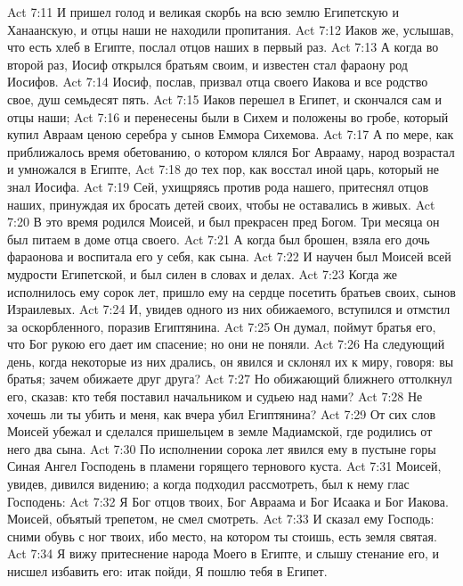 \vs Act 7:11 И пришел голод и великая скорбь на всю землю Египетскую и Ханаанскую, и отцы наши не находили пропитания.
\vs Act 7:12 Иаков же, услышав, что есть хлеб в Египте, послал  отцов наших в первый раз.
\vs Act 7:13 А когда  во второй раз, Иосиф открылся братьям своим, и известен стал фараону род Иосифов.
\vs Act 7:14 Иосиф, послав, призвал отца своего Иакова и все родство свое, душ семьдесят пять.
\vs Act 7:15 Иаков перешел в Египет, и скончался сам и отцы наши;
\vs Act 7:16 и перенесены были в Сихем и положены во гробе, который купил Авраам ценою серебра у сынов Еммора Сихемова.
\vs Act 7:17 А по мере, как приближалось время  обетованию, о котором клялся Бог Аврааму, народ возрастал и умножался в Египте,
\vs Act 7:18 до тех пор, как восстал иной царь, который не знал Иосифа.
\vs Act 7:19 Сей, ухищряясь против рода нашего, притеснял отцов наших, принуждая их бросать детей своих, чтобы не оставались в живых.
\vs Act 7:20 В это время родился Моисей, и был прекрасен пред Богом. Три месяца он был питаем в доме отца своего.
\vs Act 7:21 А когда был брошен, взяла его дочь фараонова и воспитала его у себя, как сына.
\vs Act 7:22 И научен был Моисей всей мудрости Египетской, и был силен в словах и делах.
\vs Act 7:23 Когда же исполнилось ему сорок лет, пришло ему на сердце посетить братьев своих, сынов Израилевых.
\vs Act 7:24 И, увидев одного из них обижаемого, вступился и отмстил за оскорбленного, поразив Египтянина.
\vs Act 7:25 Он думал, поймут братья его, что Бог рукою его дает им спасение; но они не поняли.
\vs Act 7:26 На следующий день, когда некоторые из них дрались, он явился и склонял их к миру, говоря: вы братья; зачем обижаете друг друга?
\vs Act 7:27 Но обижающий ближнего оттолкнул его, сказав: кто тебя поставил начальником и судьею над нами?
\vs Act 7:28 Не хочешь ли ты убить и меня, как вчера убил Египтянина?
\vs Act 7:29 От сих слов Моисей убежал и сделался пришельцем в земле Мадиамской, где родились от него два сына.
\vs Act 7:30 По исполнении сорока лет явился ему в пустыне горы Синая Ангел Господень в пламени горящего тернового куста.
\vs Act 7:31 Моисей, увидев, дивился видению; а когда подходил рассмотреть, был к нему глас Господень:
\vs Act 7:32 Я Бог отцов твоих, Бог Авраама и Бог Исаака и Бог Иакова. Моисей, объятый трепетом, не смел смотреть.
\vs Act 7:33 И сказал ему Господь: сними обувь с ног твоих, ибо место, на котором ты стоишь, есть земля святая.
\vs Act 7:34 Я вижу притеснение народа Моего в Египте, и слышу стенание его, и нисшел избавить его: итак пойди, Я пошлю тебя в Египет.
